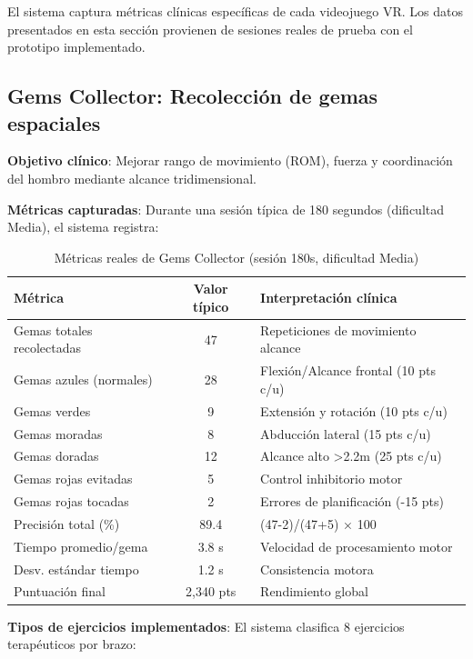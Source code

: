 El sistema captura métricas clínicas específicas de cada videojuego VR. Los datos presentados en esta sección provienen de sesiones reales de prueba con el prototipo implementado.

\subsection{Gems Collector: Recolección de gemas espaciales}

\textbf{Objetivo clínico}: Mejorar rango de movimiento (ROM), fuerza y coordinación del hombro mediante alcance tridimensional.

\textbf{Métricas capturadas}: Durante una sesión típica de 180 segundos (dificultad Media), el sistema registra:

\begin{table}[h]
\centering
\begin{tabular}{|l|c|l|}
\hline
\textbf{Métrica} & \textbf{Valor típico} & \textbf{Interpretación clínica} \\ \hline
Gemas totales recolectadas & 47 & Repeticiones de movimiento alcance \\ \hline
Gemas azules (normales) & 28 & Flexión/Alcance frontal (10 pts c/u) \\ \hline
Gemas verdes & 9 & Extensión y rotación (10 pts c/u) \\ \hline
Gemas moradas & 8 & Abducción lateral (15 pts c/u) \\ \hline
Gemas doradas & 12 & Alcance alto >2.2m (25 pts c/u) \\ \hline
Gemas rojas evitadas & 5 & Control inhibitorio motor \\ \hline
Gemas rojas tocadas & 2 & Errores de planificación (-15 pts) \\ \hline
Precisión total (\%) & 89.4 & (47-2)/(47+5) × 100 \\ \hline
Tiempo promedio/gema & 3.8 s & Velocidad de procesamiento motor \\ \hline
Desv. estándar tiempo & 1.2 s & Consistencia motora \\ \hline
Puntuación final & 2,340 pts & Rendimiento global \\ \hline
\end{tabular}
\caption{Métricas reales de Gems Collector (sesión 180s, dificultad Media)}
\label{tab:gems-metrics}
\end{table}

\textbf{Tipos de ejercicios implementados}: El sistema clasifica 8 ejercicios terapéuticos por brazo:

